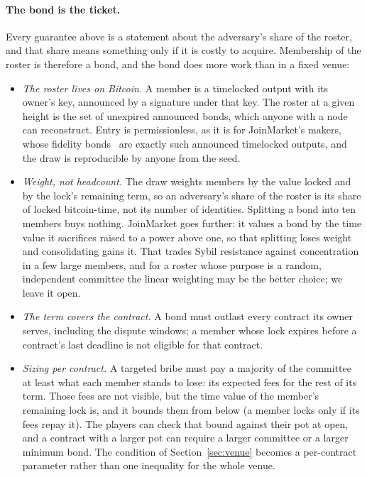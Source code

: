 \documentclass[11pt]{article}
\begin{document}
\paragraph{The bond is the ticket.} Every guarantee above is a
statement about the adversary's share of the roster, and that share
means something only if it is costly to acquire. Membership of the
roster is therefore a bond, and the bond does more work than in a fixed
venue:
\begin{itemize}
\item \emph{The roster lives on Bitcoin.} A member is a timelocked
  output with its owner's key, announced by a signature under that key.
  The roster at a given height is the set of unexpired announced bonds,
  which anyone with a node can reconstruct. Entry is permissionless,
  as it is for JoinMarket's makers, whose fidelity
  bonds~\cite{fidelity} are exactly such announced timelocked outputs,
  and the draw is reproducible by anyone from the seed.
\item \emph{Weight, not headcount.} The draw weights members by the
  value locked and by the lock's remaining term, so an adversary's share
  of the roster is its share of locked bitcoin-time, not its number of
  identities. Splitting a bond into ten members buys nothing.
  JoinMarket goes further: it values a bond by the time value it
  sacrifices raised to a power above one, so that splitting loses
  weight and consolidating gains it. That trades Sybil resistance
  against concentration in a few large members, and for a roster whose
  purpose is a random, independent committee the linear weighting may
  be the better choice; we leave it open.
\item \emph{The term covers the contract.} A bond must outlast every
  contract its owner serves, including the dispute windows; a member
  whose lock expires before a contract's last deadline is not eligible
  for that contract.
\item \emph{Sizing per contract.} A targeted bribe must pay a majority
  of the committee at least what each member stands to lose: its
  expected fees for the rest of its term. Those fees are not visible,
  but the time value of the member's remaining lock is, and it bounds
  them from below (a member locks only if its fees repay it). The
  players can check that bound against their pot at open, and a contract with a larger pot can
  require a larger committee or a larger minimum bond. The condition of
  Section~\ref{sec:venue} becomes a per-contract parameter rather than
  one inequality for the whole venue.

\end{itemize}
\end{document}
